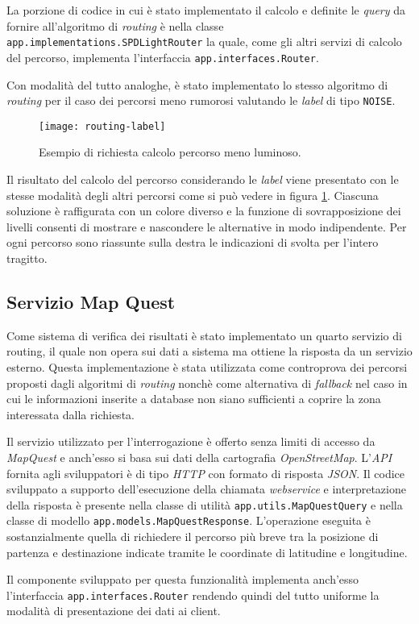 La porzione di codice in cui è stato implementato il calcolo e definite le \emph{query} da fornire all'algoritmo di \emph{routing} è nella classe \texttt{app.\-implementations.\-SPDLightRouter} la quale, come gli altri servizi di calcolo del percorso, implementa l'interfaccia \texttt{app.\-interfaces.\-Router}.

Con modalità del tutto analoghe, è stato implementato lo stesso algoritmo di \emph{routing} per il caso dei percorsi meno rumorosi valutando le \emph{label} di tipo \texttt{NOISE}.

\begin{figure}[ht]
  \centering
  \texttt{[image: routing-label]}
  \caption{\footnotesize{Esempio di richiesta calcolo percorso meno luminoso.}}
  \label{fig:routing-label}
\end{figure}

Il risultato del calcolo del percorso considerando le \emph{label} viene presentato con le stesse modalità degli altri percorsi come si può vedere in figura \ref{fig:routing-label}. Ciascuna soluzione è raffigurata con un colore diverso e la funzione di sovrapposizione dei livelli consenti di mostrare e nascondere le alternative in modo indipendente. Per ogni percorso sono riassunte sulla destra le indicazioni di svolta per l'intero tragitto.

\subsection{Servizio Map Quest}
Come sistema di verifica dei risultati è stato implementato un quarto servizio di routing, il quale non opera sui dati a sistema ma ottiene la risposta da un servizio esterno. Questa implementazione è stata utilizzata come controprova dei percorsi proposti dagli algoritmi di \emph{routing} nonchè come alternativa di \emph{fallback} nel caso in cui le informazioni inserite a database non siano sufficienti a coprire la zona interessata dalla richiesta.

Il servizio utilizzato per l'interrogazione è offerto senza limiti di accesso da \emph{MapQuest} e anch'esso si basa sui dati della cartografia \emph{OpenStreetMap}. L'\emph{API} fornita agli sviluppatori è di tipo \emph{HTTP} con formato di risposta \emph{JSON}. Il codice sviluppato a supporto dell'esecuzione della chiamata \emph{webservice} e interpretazione della risposta è presente nella classe di utilità \texttt{app.\-utils.\-MapQuestQuery} e nella classe di modello \texttt{app.\-models.\-MapQuestResponse}. L'operazione eseguita è sostanzialmente quella di richiedere il percorso più breve tra la posizione di partenza e destinazione indicate tramite le coordinate di latitudine e longitudine.

Il componente sviluppato per questa funzionalità implementa anch'esso l'interfaccia \texttt{app.\-interfaces.\-Router} rendendo quindi del tutto uniforme la modalità di presentazione dei dati ai client.

